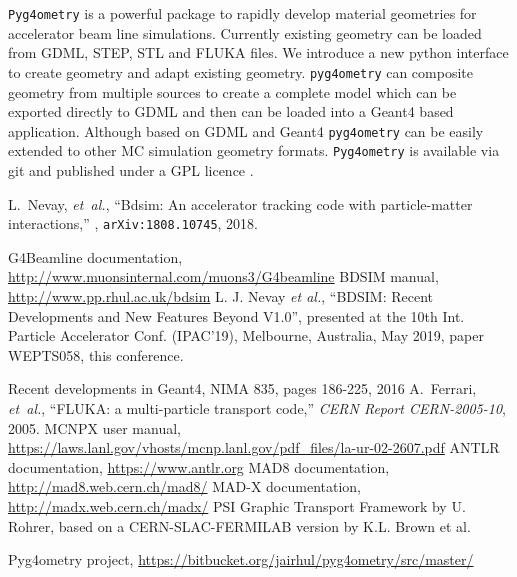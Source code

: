 \documentclass[a4paper,
               keeplastbox,   %
               ]{jacow}
\begin{document}
\verb|Pyg4ometry| is a powerful package to rapidly develop material geometries for accelerator beam line simulations. Currently existing geometry can
be loaded from GDML, STEP, STL and FLUKA files. We introduce a new python interface to create geometry and adapt existing geometry. \verb|pyg4ometry| 
can composite geometry from multiple sources to create a complete model which can be exported directly to GDML and then can be loaded into a Geant4 
based application. Although based on GDML and Geant4 \verb|pyg4ometry| can be easily extended to other MC simulation geometry formats. \verb|Pyg4ometry| is 
available via git and published under a GPL licence \cite{pyg4omtery-git}.   

%
%

%
{\printbibliography}%
{%
  
  \begin{thebibliography}{9} %
    
     L.~Nevay, \emph{ et~al.}, ``Bdsim: An accelerator tracking code with particle-matter interactions,'' , {\tt arXiv:1808.10745}, 2018.
      
       G4Beamline documentation, \url{http://www.muonsinternal.com/muons3/G4beamline}
          BDSIM manual, \url{http://www.pp.rhul.ac.uk/bdsim}
           L. J. Nevay \emph{et al.}, \textquotedblleft{BDSIM: Recent Developments and New Features Beyond V1.0}\textquotedblright, presented at the 10th Int. Particle Accelerator Conf. (IPAC'19), Melbourne, Australia, May 2019, paper WEPTS058, this conference.
            
           Recent developments in Geant4, NIMA 835, pages 186-225, 2016 
             A.~Ferrari, {\em et~al.}, ``{FLUKA}: a multi-particle transport code,'' {\em   CERN Report CERN-2005-10}, 2005.
     MCNPX user manual,  \url{https://laws.lanl.gov/vhosts/mcnp.lanl.gov/pdf\_files/la-ur-02-2607.pdf}
     ANTLR documentation, \url{https://www.antlr.org}
       MAD8 documentation, \url{http://mad8.web.cern.ch/mad8/}
         MAD-X documentation, \url{http://madx.web.cern.ch/madx/}
           PSI Graphic Transport Framework by U. Rohrer, based on a CERN-SLAC-FERMILAB version by K.L. Brown et al. 
            
             Pyg4ometry project, \url{https://bitbucket.org/jairhul/pyg4ometry/src/master/}

              \end{thebibliography}
} %
\end{document}
